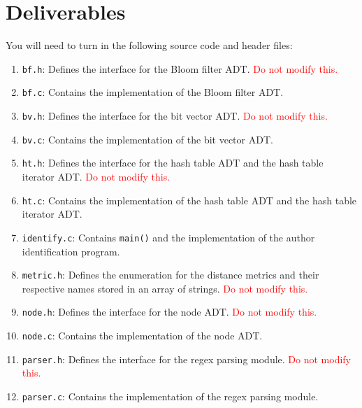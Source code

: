 \section{Deliverables}

\noindent You will need to turn in the following source code and header files:

\begin{enumerate}
  \item \texttt{bf.h}: Defines the interface for the Bloom filter ADT.
    \textcolor{red}{Do not modify this.}

  \item \texttt{bf.c}: Contains the implementation of the Bloom filter
    ADT.

  \item \texttt{bv.h}: Defines the interface for the bit vector ADT.
    \textcolor{red}{Do not modify this.}

  \item \texttt{bv.c}: Contains the implementation of the bit vector
    ADT.

  \item \texttt{ht.h}: Defines the interface for the hash table ADT and the hash
    table iterator ADT. \textcolor{red}{Do not modify this.}

  \item \texttt{ht.c}: Contains the implementation of the hash table
    ADT and the hash table iterator ADT.

  \item \texttt{identify.c}: Contains \texttt{main()} and the implementation of
    the author identification program.

  \item \texttt{metric.h}: Defines the enumeration for the distance metrics and
    their respective names stored in an array of strings. \textcolor{red}{Do not
    modify this.}

  \item \texttt{node.h}: Defines the interface for the node ADT.
    \textcolor{red}{Do not modify this.}

  \item \texttt{node.c}: Contains the implementation of the node ADT.

  \item \texttt{parser.h}: Defines the interface for the regex parsing
    module. \textcolor{red}{Do not modify this.}

  \item \texttt{parser.c}: Contains the implementation of the regex
    parsing module.


\end{enumerate}
